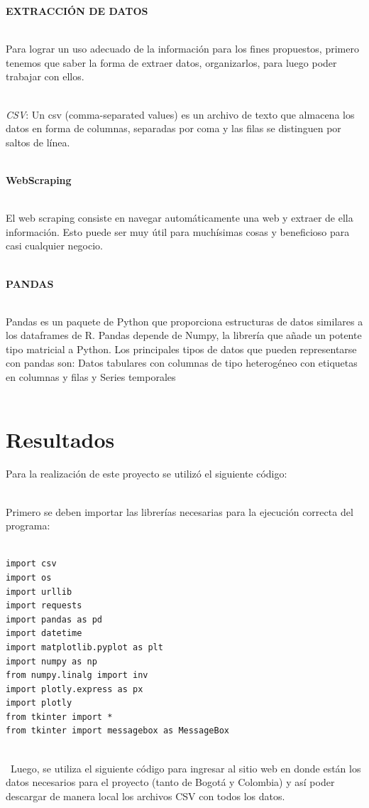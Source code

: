 \documentclass[conference,compsoc,onecolumn]{IEEEtran}
\begin{document}
\textbf{EXTRACCIÓN DE DATOS}
\\\

Para lograr un uso adecuado de la información para los fines propuestos, primero tenemos que saber la forma de extraer datos, organizarlos, para luego poder trabajar con ellos.
\\\

 \textsl{CSV}: Un csv (comma-separated values) es un archivo de texto que almacena los datos en forma de columnas, separadas por coma y las filas se distinguen por saltos de línea.~\cite{8}
 \\\

\textbf{WebScraping}
\\\

El web scraping consiste en navegar automáticamente una web y extraer de ella información. Esto puede ser muy útil para muchísimas cosas y beneficioso para casi cualquier negocio.~\cite{9}
\\\

\textbf{PANDAS}
\\\

Pandas es un paquete de Python que proporciona estructuras de datos similares a los dataframes de R. Pandas depende de Numpy, la librería que añade un potente tipo matricial a Python. Los principales tipos de datos que pueden representarse con pandas son: Datos tabulares con columnas de tipo heterogéneo con etiquetas en columnas y filas y Series temporales
\\\

\section{Resultados}
\label{sec:results}

Para la realización de este proyecto se utilizó el siguiente código:
\\\

Primero se deben importar las librerías necesarias para la ejecución correcta del programa:
\\\

\begin{lstlisting}
import csv
import os
import urllib
import requests
import pandas as pd
import datetime
import matplotlib.pyplot as plt
import numpy as np
from numpy.linalg import inv
import plotly.express as px
import plotly
from tkinter import *
from tkinter import messagebox as MessageBox

\end{lstlisting}
\\\
Luego, se utiliza el siguiente código para ingresar al sitio web en donde están los datos necesarios para el proyecto (tanto de Bogotá y Colombia) y así poder descargar de manera local los archivos CSV con todos los datos.\\\
\end{document}
